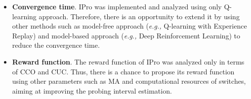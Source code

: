 \begin{itemize}
    \item \textbf{Convergence time}. IPro was implemented and analyzed using only Q-learning approach. Therefore, there is an opportunity to extend it by using other methods such as model-free approach (\textit{e.g.,} Q-learning with Experience Replay) and model-based approach (\textit{e.g.,} Deep Reinforcement Learning) to reduce the convergence time.
    \item \textbf{Reward function}. The reward function of IPro was analyzed only in terms of CCO and CUC. Thus, there is a chance to propose its reward function using other parameters such as MA and computational resources of switches, aiming at improving the probing interval estimation.
\end{itemize}

